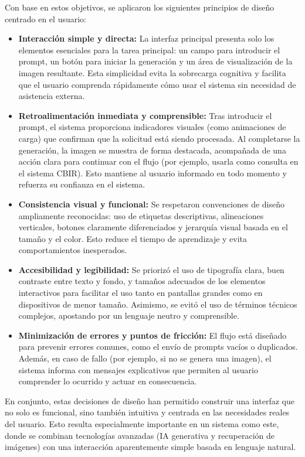 Con base en estos objetivos, se aplicaron los siguientes principios de diseño centrado en el usuario:

\begin{itemize}
    \item \textbf{Interacción simple y directa:} La interfaz principal presenta solo los elementos esenciales para la tarea principal: un campo para introducir el prompt, un botón para iniciar la generación y un área de visualización de la imagen resultante. Esta simplicidad evita la sobrecarga cognitiva y facilita que el usuario comprenda rápidamente cómo usar el sistema sin necesidad de asistencia externa.

    \item \textbf{Retroalimentación inmediata y comprensible:} Tras introducir el prompt, el sistema proporciona indicadores visuales (como animaciones de carga) que confirman que la solicitud está siendo procesada. Al completarse la generación, la imagen se muestra de forma destacada, acompañada de una acción clara para continuar con el flujo (por ejemplo, usarla como consulta en el sistema CBIR). Esto mantiene al usuario informado en todo momento y refuerza su confianza en el sistema.

    \item \textbf{Consistencia visual y funcional:} Se respetaron convenciones de diseño ampliamente reconocidas: uso de etiquetas descriptivas, alineaciones verticales, botones claramente diferenciados y jerarquía visual basada en el tamaño y el color. Esto reduce el tiempo de aprendizaje y evita comportamientos inesperados.

    \item \textbf{Accesibilidad y legibilidad:} Se priorizó el uso de tipografía clara, buen contraste entre texto y fondo, y tamaños adecuados de los elementos interactivos para facilitar el uso tanto en pantallas grandes como en dispositivos de menor tamaño. Asimismo, se evitó el uso de términos técnicos complejos, apostando por un lenguaje neutro y comprensible.

    \item \textbf{Minimización de errores y puntos de fricción:} El flujo está diseñado para prevenir errores comunes, como el envío de prompts vacíos o duplicados. Además, en caso de fallo (por ejemplo, si no se genera una imagen), el sistema informa con mensajes explicativos que permiten al usuario comprender lo ocurrido y actuar en consecuencia.
\end{itemize}

En conjunto, estas decisiones de diseño han permitido construir una interfaz que no solo es funcional, sino también intuitiva y centrada en las necesidades reales del usuario. Esto resulta especialmente importante en un sistema como este, donde se combinan tecnologías avanzadas (IA generativa y recuperación de imágenes) con una interacción aparentemente simple basada en lenguaje natural.
